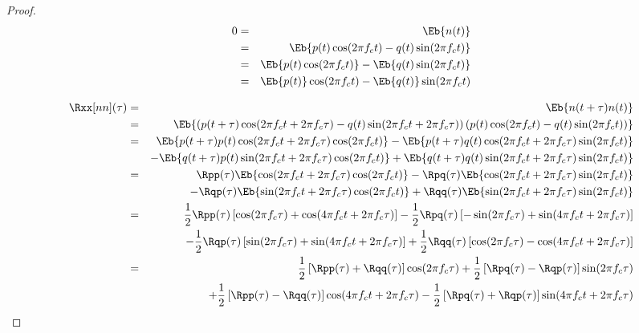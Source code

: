 \begin{proof}
\begin{eqnarray*}
   0 &=& \Eb{n(t)}
   \\&=& \Eb{p(t)\cos(2\pi f_ct) - q(t)\sin(2\pi f_c t)}
   \\&=& \Eb{p(t)\cos(2\pi f_ct)} - \Eb{q(t)\sin(2\pi f_c t)}
   \\&=& \Eb{p(t)}\cos(2\pi f_ct) - \Eb{q(t)}\sin(2\pi f_c t)
\end{eqnarray*}

\begin{eqnarray*}
   \Rxx[nn](\tau)
     &=& \Eb{n(t+\tau)n(t)}
   \\&=& \Eb{
         \left( p(t+\tau)\cos(2\pi f_ct + 2\pi f_c\tau) - q(t) \sin(2\pi f_ct + 2\pi f_c\tau)  \right)
         \left( p(t     )\cos(2\pi f_ct               ) - q(t) \sin(2\pi f_ct               )  \right)
         }
   \\&=& \Eb{ p(t+\tau)p(t) \cos(2\pi f_ct + 2\pi f_c\tau) \cos(2\pi f_ct) }
        -\Eb{ p(t+\tau)q(t) \cos(2\pi f_ct + 2\pi f_c\tau) \sin(2\pi f_ct) }
   \\&& -\Eb{ q(t+\tau)p(t) \sin(2\pi f_ct + 2\pi f_c\tau) \cos(2\pi f_ct) }
        +\Eb{ q(t+\tau)q(t) \sin(2\pi f_ct + 2\pi f_c\tau) \sin(2\pi f_ct) }
%
   \\&=& \Rpp(\tau) \Eb{ \cos(2\pi f_ct + 2\pi f_c\tau) \cos(2\pi f_ct) }
        -\Rpq(\tau) \Eb{ \cos(2\pi f_ct + 2\pi f_c\tau) \sin(2\pi f_ct) }
   \\&& -\Rqp(\tau) \Eb{ \sin(2\pi f_ct + 2\pi f_c\tau) \cos(2\pi f_ct) }
        +\Rqq(\tau) \Eb{ \sin(2\pi f_ct + 2\pi f_c\tau) \sin(2\pi f_ct) }
%
   \\&=& \frac{1}{2} \Rpp(\tau) \left[ \cos(2\pi f_c\tau) + \cos(4\pi f_ct + 2\pi f_c\tau) \right]
        -\frac{1}{2} \Rpq(\tau) \left[-\sin(2\pi f_c\tau) + \sin(4\pi f_ct + 2\pi f_c\tau) \right]
   \\&& -\frac{1}{2} \Rqp(\tau) \left[ \sin(2\pi f_c\tau) + \sin(4\pi f_ct + 2\pi f_c\tau) \right]
        +\frac{1}{2} \Rqq(\tau) \left[ \cos(2\pi f_c\tau) - \cos(4\pi f_ct + 2\pi f_c\tau) \right]
%
   \\&=& \frac{1}{2}\left[ \Rpp(\tau) + \Rqq(\tau)\right] \cos(2\pi f_c\tau)
        +\frac{1}{2}\left[ \Rpq(\tau) - \Rqp(\tau)\right] \sin(2\pi f_c\tau)
   \\&& +\frac{1}{2}\left[ \Rpp(\tau) - \Rqq(\tau)\right] \cos(4\pi f_ct + 2\pi f_c\tau)
        -\frac{1}{2}\left[ \Rpq(\tau) + \Rqp(\tau)\right] \sin(4\pi f_ct + 2\pi f_c\tau)
\end{eqnarray*}


\end{proof}
